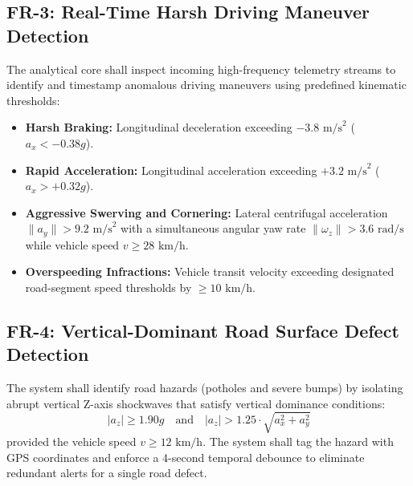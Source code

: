 \subsection{FR-3: Real-Time Harsh Driving Maneuver Detection}
The analytical core shall inspect incoming high-frequency telemetry streams to identify and timestamp anomalous driving maneuvers using predefined kinematic thresholds:
\begin{itemize}
    \item \textbf{Harsh Braking:} Longitudinal deceleration exceeding $-3.8\text{ m/s}^2$ ($a_x < -0.38g$).
    \item \textbf{Rapid Acceleration:} Longitudinal acceleration exceeding $+3.2\text{ m/s}^2$ ($a_x > +0.32g$).
    \item \textbf{Aggressive Swerving and Cornering:} Lateral centrifugal acceleration $\|a_y\| > 9.2\text{ m/s}^2$ with a simultaneous angular yaw rate $\|\omega_z\| > 3.6\text{ rad/s}$ while vehicle speed $v \ge 28\text{ km/h}$.
    \item \textbf{Overspeeding Infractions:} Vehicle transit velocity exceeding designated road-segment speed thresholds by $\ge 10\text{ km/h}$.
\end{itemize}

\subsection{FR-4: Vertical-Dominant Road Surface Defect Detection}
The system shall identify road hazards (potholes and severe bumps) by isolating abrupt vertical Z-axis shockwaves that satisfy vertical dominance conditions:
\begin{equation}
    |a_z| \ge 1.90g \quad \text{and} \quad |a_z| > 1.25 \cdot \sqrt{a_x^2 + a_y^2}
\end{equation}
provided the vehicle speed $v \ge 12\text{ km/h}$. The system shall tag the hazard with GPS coordinates and enforce a 4-second temporal debounce to eliminate redundant alerts for a single road defect.

